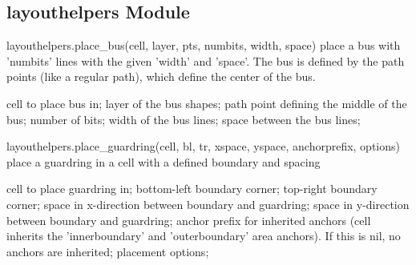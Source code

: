 \subsection{layouthelpers Module}
\begin{APIfunc}{layouthelpers.place\_bus(cell, layer, pts, numbits, width, space)}
    place a bus with 'numbits' lines with the given 'width' and 'space'. The bus is defined by the path points (like a regular path), which define the center of the bus.
    \begin{APIparameters}
            cell to place bus in;
            layer of the bus shapes;
            path point defining the middle of the bus;
            number of bits;
            width of the bus lines;
            space between the bus lines;
    \end{APIparameters}
\end{APIfunc}
\begin{APIfunc}{layouthelpers.place\_guardring(cell, bl, tr, xspace, yspace, anchorprefix, options)}
    place a guardring in a cell with a defined boundary and spacing
    \begin{APIparameters}
            cell to place guardring in;
            bottom-left boundary corner;
            top-right boundary corner;
            space in x-direction between boundary and guardring;
            space in y-direction between boundary and guardring;
            anchor prefix for inherited anchors (cell inherits the 'innerboundary' and 'outerboundary' area anchors). If this is nil, no anchors are inherited;
            placement options;
    \end{APIparameters}
\end{APIfunc}
